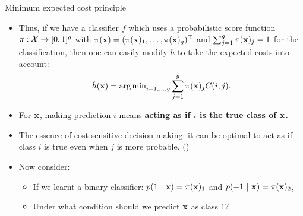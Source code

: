 \documentclass[11pt,compress,t,notes=noshow, xcolor=table]{beamer}
\begin{document}
\begin{vbframe}{Minimum expected cost principle}
    \footnotesize
    \begin{itemize}
        \item Thus, if we have a classifier $f$ which uses a probabilistic score function $\pi:\mathcal{X} \to [0,1]^g$ with $\pi(\mathbf{x}) = (\pi(\mathbf{x})_1,\ldots,\pi(\mathbf{x})_g)^\top$ and $\sum_{j=1}^g \pi(\mathbf{x})_j = 1$ for the classification, then one can easily modify $h$ to take the expected costs into account:
		$$  \tilde h(\mathbf{x}) = \operatorname{arg\,min}_{i=1,\ldots,g} \sum_{j=1}^g 	\pi(\mathbf{x})_j C(i,j). $$
        \vspace{10pt}

        \item For $\mathbf{x}$, making prediction $i$ means \textbf{acting as if $i$ is the true class of $\mathbf{x}$.}
        \vspace{10pt}
        
        \item The essence of cost-sensitive decision-making: it can be optimal to act as if class $i$ is true even when $j$ is more probable. (\href{https://dl.acm.org/doi/10.5555/1642194.1642224}{})
        \vspace{10pt}

        \item Now consider: 
        \begin{itemize}
            \footnotesize
            \item If we learnt a binary classifier: $p(1 ~|~ \mathbf{x}) = \pi(\mathbf{x})_1$ and $p(-1 ~|~ \mathbf{x}) = \pi(\mathbf{x})_2$,
            \item Under what condition should we predict $\mathbf{x}$ as class $1$?
        \end{itemize}
    \end{itemize}
\end{vbframe}
\end{document}
